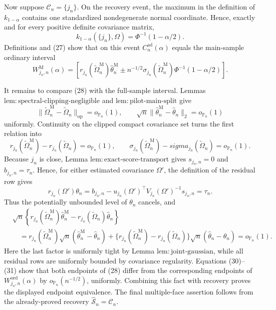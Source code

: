 Now suppose \(\mathcal C_n=\{j_n\}\).  On the recovery event, the maximum in the definition of \(k_{1-\alpha}\) contains one standardized nondegenerate normal coordinate.  Hence, exactly and for every positive definite covariance matrix,
\[
 k_{1-\alpha}(\{j_n\},\Omega)=\Phi^{-1}(1-\alpha/2).
\tag{27}
\]
Definitions and (27) show that on this event \(C_n^{\mathrm{ad}}(\alpha)\) equals the main-sample ordinary interval
\[
 W_{j_n,n}^{\mathrm M}(\alpha)
 =\left[
 r_{j_n}(\widetilde\Omega_n^{\mathrm M})\widehat\theta_n^{\mathrm M}
 \mathbin{\pm}n^{-1/2}\sigma_{j_n}(\widetilde\Omega_n^{\mathrm M})
 \Phi^{-1}(1-\alpha/2)
 \right].
\tag{28}
\]

It remains to compare (28) with the full-sample interval.  Lemmas \(\mathrm{lem:spectral\text{-}clipping\text{-}negligible}\) and \(\mathrm{lem:pilot\text{-}main\text{-}split}\) give
\[
 \|\widetilde\Omega_n^{\mathrm M}-\widetilde\Omega_n\|_{\mathrm{op}}=o_{\mathbb P_n}(1),
 \qquad
 \sqrt n\|\widehat\theta_n^{\mathrm M}-\widehat\theta_n\|_2
 =o_{\mathbb P_n}(1)
\tag{29}
\]
uniformly.  Continuity on the clipped compact covariance set turns the first relation into
\[
 r_{j_n}(\widetilde\Omega_n^{\mathrm M})-r_{j_n}(\widetilde\Omega_n)
 =o_{\mathbb P_n}(1),
 \qquad
 \sigma_{j_n}(\widetilde\Omega_n^{\mathrm M})-sigma_{j_n}(\widetilde\Omega_n)
 =o_{\mathbb P_n}(1).
\tag{30}
\]
Because \(j_n\) is close, Lemma \(\mathrm{lem:exact\text{-}score\text{-}transport}\) gives \(s_{j_n,n}=0\) and \(b_{j_n,n}=\tau_n\).  Hence, for either estimated covariance \(\Omega'\), the definition of the residual row gives
\[
 r_{j_n}(\Omega')\theta_n
 =b_{j_n,n}-u_{j_n}(\Omega')^{\top}V_{j_n}(\Omega')^{-1}s_{j_n,n}
 =\tau_n.
\]
Thus the potentially unbounded level of \(\theta_n\) cancels, and
\[
\begin{aligned}
 &\sqrt n\left\{
 r_{j_n}(\widetilde\Omega_n^{\mathrm M})\widehat\theta_n^{\mathrm M}
 -r_{j_n}(\widetilde\Omega_n)\widehat\theta_n
 \right\}\\
 &\quad=
 r_{j_n}(\widetilde\Omega_n^{\mathrm M})
 \sqrt n(\widehat\theta_n^{\mathrm M}-\widehat\theta_n)
 +\{r_{j_n}(\widetilde\Omega_n^{\mathrm M})
      -r_{j_n}(\widetilde\Omega_n)\}
 \sqrt n(\widehat\theta_n-\theta_n)
 =o_{\mathbb P_n}(1).
\end{aligned}
\tag{31}
\]
Here the last factor is uniformly tight by Lemma \(\mathrm{lem:joint\text{-}gaussian}\), while all residual rows are uniformly bounded by covariance regularity.  Equations (30)--(31) show that both endpoints of (28) differ from the corresponding endpoints of \(W_{j_n,n}^{\mathrm{ord}}(\alpha)\) by \(o_{\mathbb P_n}(n^{-1/2})\), uniformly.  Combining this fact with recovery proves the displayed endpoint equivalence.  The final multiple-face assertion follows from the already-proved recovery \(\widehat{\mathcal S}_n=\mathcal C_n\).

